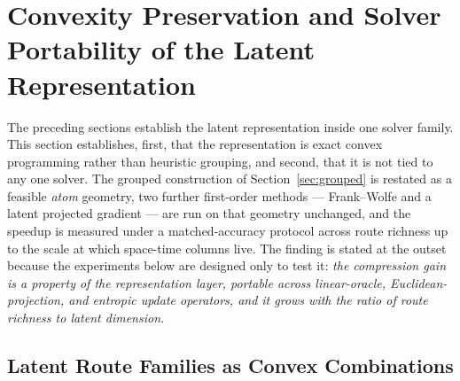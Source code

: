 
\section{Convexity Preservation and Solver Portability of the Latent Representation}
\label{sec:fw_origin}

The preceding sections establish the latent representation inside one
solver family. This section establishes, first, that the representation
is exact convex programming rather than heuristic grouping, and second,
that it is not tied to any one solver. The grouped construction of
Section~\ref{sec:grouped} is restated as a feasible \emph{atom}
geometry, two further first-order methods --- Frank--Wolfe and a latent
projected gradient --- are run on that geometry unchanged, and the
speedup is measured under a matched-accuracy protocol across route
richness up to the scale at which space-time columns live. The finding
is stated at the outset because the experiments below are designed only
to test it: \emph{the compression gain is a property of the
representation layer, portable across linear-oracle,
Euclidean-projection, and entropic update operators, and it grows with
the ratio of route richness to latent dimension.}

\subsection{Latent Route Families as Convex Combinations}
\label{sec:latent-convex}

